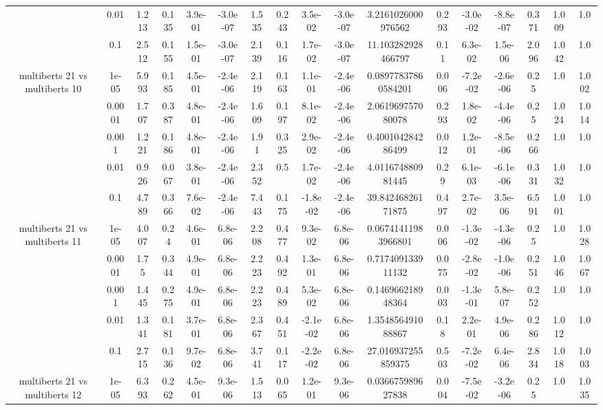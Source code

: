 \begin{tabular}{|c|c|c|c|c|c|c|c|c|c|c|c|c|c|c|c|c|}
 & 0.01 & 1.213 & 0.135 & 3.9e-01 & -3.0e-07 & 1.535 & 0.243 & 3.5e-02 & -3.0e-07 & 3.2161026000976562 & 0.293 & -3.0e-02 & -8.8e-07 & 0.371 & 1.009 & 1.0 \\
 & 0.1 & 2.512 & 0.155 & 1.5e-01 & -3.0e-07 & 2.139 & 0.116 & 1.7e-02 & -3.0e-07 & 11.103282928466797 & 0.11 & 6.3e-02 & 1.5e-06 & 2.096 & 1.042 & 1.0 \\
\hline
\multirow{5}{*}{multiberts 21 vs multiberts 10} & 1e-05 & 5.993 & 0.185 & 4.5e-01 & -2.4e-06 & 2.119 & 0.163 & 1.1e-01 & -2.4e-06 & 0.08977837860584201 & 0.006 & -7.2e-02 & -2.6e-06 & 0.25 & 1.0 & 1.002 \\
 & 0.0001 & 1.707 & 0.387 & 4.8e-01 & -2.4e-06 & 1.609 & 0.197 & 8.1e-02 & -2.4e-06 & 2.061969757080078 & 0.293 & 1.8e-02 & -4.4e-06 & 0.25 & 1.024 & 1.014 \\
 & 0.001 & 1.221 & 0.186 & 4.8e-01 & -2.4e-06 & 1.91 & 0.325 & 2.9e-02 & -2.4e-06 & 0.400104284286499 & 0.012 & 1.2e-01 & -8.5e-06 & 0.266 & 1.0 & 1.0 \\
 & 0.01 & 0.926 & 0.067 & 3.8e-01 & -2.4e-06 & 2.352 & 0.5 & 1.7e-02 & -2.4e-06 & 4.011674880981445 & 0.29 & 6.1e-03 & -6.1e-06 & 0.331 & 1.032 & 1.0 \\
 & 0.1 & 4.789 & 0.366 & 7.6e-02 & -2.4e-06 & 7.443 & 0.175 & -1.8e-02 & -2.4e-06 & 39.84246826171875 & 0.497 & 2.7e-02 & 3.5e-06 & 6.591 & 1.001 & 1.0 \\
\hline
\multirow{5}{*}{multiberts 21 vs multiberts 11} & 1e-05 & 4.007 & 0.24 & 4.6e-01 & 6.8e-06 & 2.208 & 0.477 & 9.3e-02 & 6.8e-06 & 0.06741411983966801 & 0.006 & -1.3e-02 & -4.3e-06 & 0.25 & 1.0 & 1.028 \\
 & 0.0001 & 1.75 & 0.344 & 4.9e-01 & 6.8e-06 & 2.223 & 0.492 & 1.3e-01 & 6.8e-06 & 0.717409133911132 & 0.075 & -2.8e-02 & -1.0e-06 & 0.251 & 1.046 & 1.067 \\
 & 0.001 & 1.445 & 0.275 & 4.9e-01 & 6.8e-06 & 2.223 & 0.489 & 5.3e-02 & 6.8e-06 & 0.146966218948364 & 0.003 & -1.3e-01 & 5.8e-07 & 0.252 & 1.0 & 1.0 \\
 & 0.01 & 1.341 & 0.181 & 3.7e-01 & 6.8e-06 & 2.367 & 0.451 & -2.1e-02 & 6.8e-06 & 1.354856491088867 & 0.18 & 2.2e-01 & 4.9e-06 & 0.286 & 1.012 & 1.0 \\
 & 0.1 & 2.715 & 0.136 & 9.7e-02 & 6.8e-06 & 3.741 & 0.117 & -2.2e-02 & 6.8e-06 & 27.016937255859375 & 0.503 & -7.2e-02 & 6.4e-06 & 2.834 & 1.018 & 1.003 \\
\hline
\multirow{5}{*}{multiberts 21 vs multiberts 12} & 1e-05 & 6.393 & 0.262 & 4.5e-01 & 9.3e-06 & 1.513 & 0.065 & 1.2e-01 & 9.3e-06 & 0.036675989627838 & 0.004 & -7.5e-02 & -3.2e-06 & 0.25 & 1.0 & 1.035 \\

\end{tabular}
